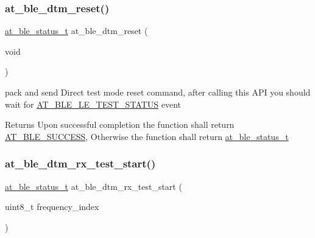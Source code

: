 \subsubsection{\texorpdfstring{at\_ble\_dtm\_reset()}{at\_ble\_dtm\_reset()}}
{\footnotesize\ttfamily \mbox{\hyperlink{group__error__codes__group_ga3b1db9b95feb157b3c188ca27fe76988}{at\+\_\+ble\+\_\+status\+\_\+t}} at\+\_\+ble\+\_\+dtm\+\_\+reset (\begin{DoxyParamCaption}\item[{void}]{ }\end{DoxyParamCaption})}



pack and send Direct test mode reset command, after calling this A\+PI you should wait for \mbox{\hyperlink{at__ble__api_8h_a3324640b95f33169515f89738ed5baeba1dfeb2b9d9a9ceae264ac9eceae01f56}{A\+T\+\_\+\+B\+L\+E\+\_\+\+L\+E\+\_\+\+T\+E\+S\+T\+\_\+\+S\+T\+A\+T\+US}} event 

\begin{DoxyReturn}{Returns}
Upon successful completion the function shall return \mbox{\hyperlink{group__error__codes__group_gga3b1db9b95feb157b3c188ca27fe76988a7e3bfff5387331cd4f2c56cbcbbd7e19}{A\+T\+\_\+\+B\+L\+E\+\_\+\+S\+U\+C\+C\+E\+SS}}, Otherwise the function shall return \mbox{\hyperlink{at__ble__api_8h_ace24eb4e5ca3f325c663b809da5feb92}{at\+\_\+ble\+\_\+status\+\_\+t}} 
\end{DoxyReturn}
\mbox{\label{group__dtm__group_ga37c9b74a351ddbed677bfb0b6b9396a9}} 
\subsubsection{\texorpdfstring{at\_ble\_dtm\_rx\_test\_start()}{at\_ble\_dtm\_rx\_test\_start()}}
{\footnotesize\ttfamily \mbox{\hyperlink{group__error__codes__group_ga3b1db9b95feb157b3c188ca27fe76988}{at\+\_\+ble\+\_\+status\+\_\+t}} at\+\_\+ble\+\_\+dtm\+\_\+rx\+\_\+test\+\_\+start (\begin{DoxyParamCaption}\item[{uint8\+\_\+t}]{frequency\+\_\+index }\end{DoxyParamCaption})}



